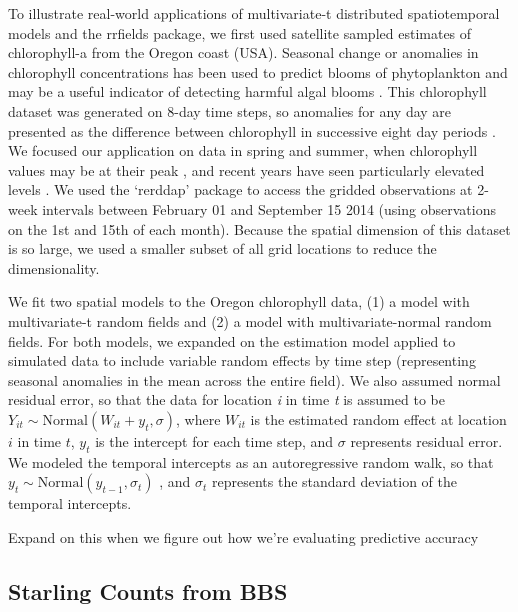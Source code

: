 \documentclass[12pt,english]{article}
\begin{document}
To illustrate real-world applications of multivariate-t distributed
spatiotemporal models and the rrfields package, we first used satellite sampled
estimates of chlorophyll-a from the Oregon coast (USA). Seasonal change or
anomalies in chlorophyll concentrations has been used to predict blooms of
phytoplankton \citep{mckibben2012} and may be a useful indicator of detecting
harmful algal blooms \citep{tweddle2010}. This chlorophyll dataset was
generated on 8-day time steps, so anomalies for any day are presented as the
difference between chlorophyll in successive eight day periods
\citep{mckibben2012}. We focused our application on data in spring and summer,
when chlorophyll values may be at their peak \citep{mckibben2012}, and recent
years have seen particularly elevated levels \citep{du2016}. We used the
`rerddap' package to access the gridded observations at 2-week intervals
between February 01 and September 15 2014 (using observations on the 1st and
15th of each month). Because the spatial dimension of this dataset is so large,
we used a smaller subset of all grid locations to reduce the dimensionality.

We fit two spatial models to the Oregon chlorophyll data, (1) a model with
multivariate-t random fields and (2) a model with multivariate-normal random
fields. For both models, we expanded on the estimation model applied to
simulated data to include variable random effects by time step (representing
seasonal anomalies in the mean across the entire field). We also assumed normal
residual error, so that the data for location \emph{i} in time \emph{t} is
assumed to be $Y_{it}\sim \mathrm{Normal}\left(W_{it}+{y}_{t
   },\sigma \right)$, where ${W}_{it}$ is the estimated random effect
at location $i$ in time $t$, ${y}_{t}$ is the intercept for each time
step, and $\sigma$ represents residual error. We modeled the temporal
intercepts as an autoregressive random walk, so that ${y}_{t}\sim
  \mathrm{Normal}\left( {y}_{t-1},{\sigma}_{t} \right)$ , and
${\sigma}_{t}$ represents the standard deviation of the temporal
intercepts.

Expand on this when we figure out how we're evaluating predictive accuracy

\subsection{Starling Counts from BBS}
\end{document}

